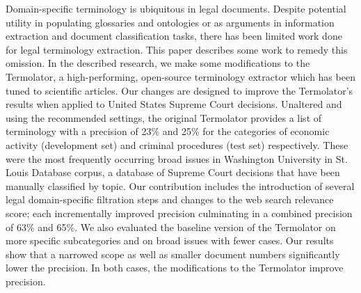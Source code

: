 Domain-specific terminology is ubiquitous in legal documents. Despite potential utility in populating glossaries and ontologies or as arguments in information extraction and document classification tasks, there has been limited work done for legal terminology extraction. This paper describes some work to remedy this omission. In the described research, we make some modifications to the Termolator, a high-performing, open-source terminology extractor which has been tuned to scientific articles. Our changes are designed to improve the Termolator's results when applied to United States Supreme Court decisions. Unaltered and using the recommended settings, the original Termolator provides a list of terminology with a precision of 23\%  and 25\% for the categories of economic activity (development set) and criminal procedures (test set) respectively. These were the most frequently occurring broad issues in Washington University in St. Louis Database corpus, a database of Supreme Court decisions that have been manually classified by topic. Our contribution includes the introduction of several legal domain-specific filtration steps and changes to the web search relevance score; each incrementally improved precision culminating in a combined precision of 63\% and 65\%. We also evaluated the baseline version of the Termolator on more specific subcategories and on broad issues with fewer cases. Our results show that a narrowed scope as well as smaller document numbers significantly lower the precision. In both cases, the modifications to the Termolator improve precision.
